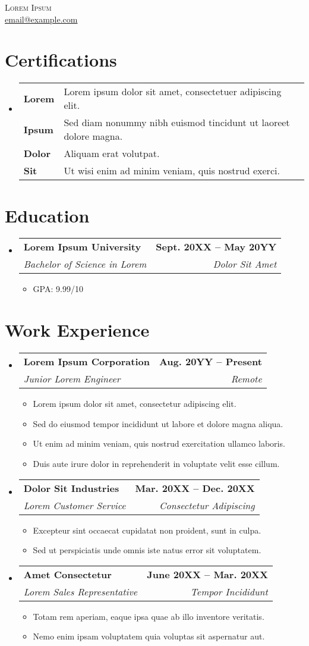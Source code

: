 \documentclass[letterpaper,11pt]{article}
\makeatletter
\newcommand{\resumeItem}[1]{
  \item\small{ {#1 \vspace{-2pt}} }
}
\newcommand{\resumeSubheading}[4]{
  \vspace{-2pt}\item
    \begin{tabular*}{1.0\textwidth}[t]{l@{\extracolsep{\fill}}r}
      \textbf{#1} & \textbf{\small #2} \\
      \textit{\small #3} & \textit{\small #4} \\
    \end{tabular*}\vspace{-7pt}
}
\newcommand{\resumeSubHeadingListStart}{\begin{itemize}[leftmargin=0in, label={}]}
\newcommand{\resumeSubHeadingListEnd}{\end{itemize}}
\newcommand{\resumeItemListStart}{\begin{itemize}}
\newcommand{\resumeItemListEnd}{\end{itemize}\vspace{-5pt}}
\makeatother
\begin{document}
\begin{center}
    {\Huge \scshape Lorem Ipsum} \\ \vspace{2pt}
    \href{mailto:email@example.com}{email@example.com}
\end{center}

\section{Certifications}
\resumeSubHeadingListStart
    \item
    \begin{tabular}{p{3cm} p{10cm}}
    \textbf{Lorem}      & Lorem ipsum dolor sit amet, consectetuer adipiscing elit. \\
    \textbf{Ipsum}      & Sed diam nonummy nibh euismod tincidunt ut laoreet dolore magna. \\
    \textbf{Dolor}      & Aliquam erat volutpat. \\ 
    \textbf{Sit}        & Ut wisi enim ad minim veniam, quis nostrud exerci. \\
    \end{tabular}
\resumeSubHeadingListEnd

\section{Education}
\resumeSubHeadingListStart
    \resumeSubheading
      {Lorem Ipsum University}{Sept. 20XX -- May 20YY}
      {Bachelor of Science in Lorem}{Dolor Sit Amet}
    \resumeItemListStart
        \resumeItem{GPA: 9.99/10}
    \resumeItemListEnd
\resumeSubHeadingListEnd

\section{Work Experience}
\resumeSubHeadingListStart
    \resumeSubheading
      {Lorem Ipsum Corporation}{Aug. 20YY -- Present}
      {Junior Lorem Engineer}{Remote}
      \resumeItemListStart
          \resumeItem{Lorem ipsum dolor sit amet, consectetur adipiscing elit.}
          \resumeItem{Sed do eiusmod tempor incididunt ut labore et dolore magna aliqua.}
          \resumeItem{Ut enim ad minim veniam, quis nostrud exercitation ullamco laboris.}
          \resumeItem{Duis aute irure dolor in reprehenderit in voluptate velit esse cillum.}
      \resumeItemListEnd
    \resumeSubheading
      {Dolor Sit Industries}{Mar. 20XX -- Dec. 20XX}
      {Lorem Customer Service}{Consectetur Adipiscing}
      \resumeItemListStart
          \resumeItem{Excepteur sint occaecat cupidatat non proident, sunt in culpa.}
          \resumeItem{Sed ut perspiciatis unde omnis iste natus error sit voluptatem.}
      \resumeItemListEnd
    \resumeSubheading
      {Amet Consectetur}{June 20XX -- Mar. 20XX}
      {Lorem Sales Representative}{Tempor Incididunt}
      \resumeItemListStart
          \resumeItem{Totam rem aperiam, eaque ipsa quae ab illo inventore veritatis.}
          \resumeItem{Nemo enim ipsam voluptatem quia voluptas sit aspernatur aut.}
      \resumeItemListEnd
\resumeSubHeadingListEnd
\end{document}
